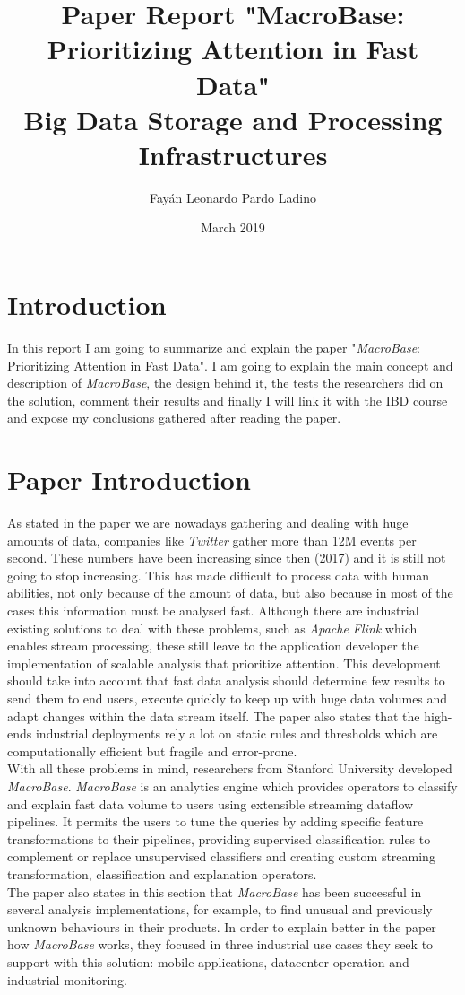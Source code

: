 \documentclass[11pt, titlepage]{article}
\title{Paper Report "MacroBase: Prioritizing Attention in Fast Data" \\ Big Data Storage and Processing Infrastructures}
\author{Fayán Leonardo Pardo Ladino}
\date{March 2019}
\begin{document}
	\maketitle
	\section{Introduction}
		In this report I am going to summarize and explain the paper "\textit{MacroBase}: Prioritizing Attention in Fast Data". I am going to explain the main concept and description of \textit{MacroBase}, the design behind it, the tests the researchers did on the solution, comment their results and finally I will link it with the IBD course and expose my conclusions gathered after reading the paper.
	\section{Paper Introduction}
		As stated in the paper we are nowadays gathering and dealing with huge amounts of data, companies like \textit{Twitter} gather more than 12M events per second. These numbers have been increasing since then (2017) and it is still not going to stop increasing. This has made difficult to process data with human abilities, not only because of the amount of data, but also because in most of the cases this information must be analysed fast. Although there are industrial existing solutions to deal with these problems, such as \textit{Apache Flink} which enables stream processing, these still leave to the application developer the implementation of scalable analysis that prioritize attention. This development should take into account that fast data analysis should determine few results to send them to end users, execute quickly to keep up with huge data volumes and adapt changes within the data stream itself. The paper also states that the high-ends industrial deployments rely a lot on static rules and thresholds which are computationally efficient but fragile and error-prone.
		\\With all these problems in mind, researchers from Stanford University developed \textit{MacroBase}. \textit{MacroBase} is an analytics engine which provides operators to classify and explain fast data volume to users using extensible streaming dataflow pipelines. It permits the users to tune the queries by adding specific feature transformations to their pipelines, providing supervised classification rules to complement or replace unsupervised classifiers and creating custom streaming transformation, classification and explanation operators.
		\\The paper also states in this section that \textit{MacroBase} has been successful in several analysis implementations, for example, to find unusual and previously unknown behaviours in their products. In order to explain better in the paper how \textit{MacroBase} works, they focused in three industrial use cases they seek to support with this solution: mobile applications, datacenter operation and industrial monitoring.
\end{document}
